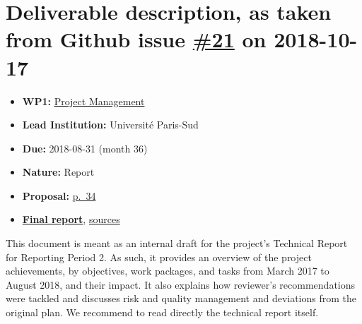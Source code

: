 \section*{\texorpdfstring{Deliverable description, as taken from Github
issue
\href{https://github.com/OpenDreamKit/OpenDreamKit/issues/21}{\#21} on
2018-10-17}{Deliverable description, as taken from Github issue \#21 on 2018-10-17}}\label{deliverable-description-as-taken-from-github-issue-21-on-2018-10-17}

\begin{itemize}
\tightlist
\item
  \textbf{WP1:}
  \href{https://github.com/OpenDreamKit/OpenDreamKit/tree/master/WP1}{Project
  Management}
\item
  \textbf{Lead Institution:} Université Paris-Sud
\item
  \textbf{Due:} 2018-08-31 (month 36)
\item
  \textbf{Nature:} Report
\item
  \textbf{Proposal:}
  \href{https://github.com/OpenDreamKit/OpenDreamKit/raw/master/Proposal/proposal-www.pdf}{p.~34}
\item
  \textbf{\href{https://github.com/OpenDreamKit/OpenDreamKit/blob/master/WP1/D1.5/report-final.pdf}{Final
  report}},
  \href{https://github.com/OpenDreamKit/OpenDreamKit/tree/master/WP1/D1.5}{sources}
\end{itemize}

This document is meant as an internal draft for the project's Technical
Report for Reporting Period 2. As such, it provides an overview of the
project achievements, by objectives, work packages, and tasks from March
2017 to August 2018, and their impact. It also explains how reviewer's
recommendations were tackled and discusses risk and quality management
and deviations from the original plan. We recommend to read directly the
technical report itself.
